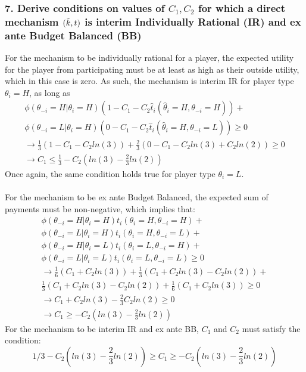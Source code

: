 \documentclass[a4paper]{article}
\begin{document}
	\subsubsection*{7. Derive conditions on values of $C_1,C_2$ for which a direct mechanism $(\Tilde{k},t)$ is interim Individually Rational (IR) and ex ante Budget Balanced (BB)}
	For the mechanism to be individually rational for a player, the expected utility for the player from participating must be at least as high as their outside utility, which in this case is zero. As such, the mechanism is interim IR for player type $\theta_{i}=H$, as long as 
	\begin{align}
		\phi(\theta_{-i}=H|\theta_{i}=H)(1-C_{1}-C_{2}\hat{t}_{i}(\hat{\theta}_{i}=H,\theta_{-i}=H))+\nonumber\\
		\phi(\theta_{-i}=L|\theta_{i}=H)(0-C_{1}-C_{2}\hat{t}_{i}(\hat{\theta}_{i}=H,\theta_{-i}=L)) \geq 0\\
		\rightarrow
		\frac{1}{3}(1-C_{1}-C_{2}ln(3))+\frac{2}{3}(0-C_{1}-C_{2}ln(3)+C_{2}ln(2)) \geq 0\\
		\rightarrow
		C_1\leq\frac{1}{3}-C_2(ln(3)-\frac{2}{3}ln(2))
	\end{align}
	Once again, the same condition holds true for player type $\theta_{i}=L$.\\\\
	For the mechanism to be ex ante Budget Balanced, the expected sum of payments must be non-negative, which implies that:
	\begin{align}
		\phi(\theta_{-i}=H|\theta_{i}=H)t_i(\theta_{i}=H,\theta_{-i}=H)+\nonumber\\
		\phi(\theta_{-i}=L|\theta_{i}=H)t_i(\theta_{i}=H,\theta_{-i}=L)+\nonumber\\
		\phi(\theta_{-i}=H|\theta_{i}=L)t_i(\theta_{i}=L,\theta_{-i}=H)+\nonumber\\
		\phi(\theta_{-i}=L|\theta_{i}=L)t_i(\theta_{i}=L,\theta_{-i}=L)\geq 0\\
		\rightarrow
		\frac{1}{6}(C_1+C_2ln(3))+\frac{1}{3}(C_1+C_2ln(3)-C_2ln(2))+\nonumber\\
		\frac{1}{3}(C_1+C_2ln(3)-C_2ln(2))+\frac{1}{6}(C_1+C_2ln(3))\geq 0\\
		\rightarrow
		C_1+C_2ln(3)-\frac{2}{3}C_2ln(2)\geq 0\\
		\rightarrow
		C_1\geq -C_2(ln(3)-\frac{2}{3}ln(2))
	\end{align}
	For the mechanism to be interim IR and ex ante BB, $C_1$ and $C_2$ must satisfy the condition:
	\begin{equation}
		1/3-C_2(ln(3)-\frac{2}{3}ln(2))\geq C_1 \geq -C_2(ln(3)-\frac{2}{3}ln(2))
	\end{equation}
	
\end{document}
